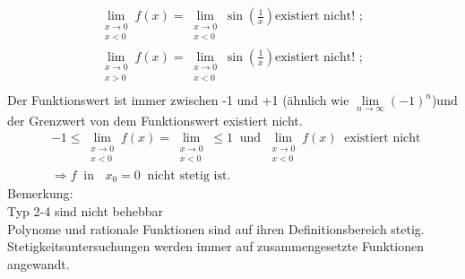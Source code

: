\begin{align*}
\lim\limits_ {\substack{x \to 0\\x<0}}f(x)=\lim\limits_ {\substack{x \to 0\\x<0}} \sin(\frac{1}{x})\text{existiert nicht! };\;\\
\lim\limits_ {\substack{x \to 0\\x>0}}f(x)=\lim\limits_ {\substack{x \to 0\\x<0}} \sin(\frac{1}{x})\text{existiert nicht! };\;\\
\end{align*}
Der Funktionswert ist immer zwischen -1 und +1 (ähnlich wie $ \lim\limits_ {n\to\infty}(-1)^n $)und der Grenzwert von dem Funktionswert existiert nicht.\\
\begin{align*}
&-1\leq\lim\limits_ {\substack{x \to 0\\x<0}}f(x)=\lim\limits_ {\substack{x \to 0\\x<0}}\leq 1 \;\;\text{und }\lim\limits_ {\substack{x \to 0\\x<0}}f(x)\;\;\text{existiert nicht }\\
&\Rightarrow f \;\;\text{in }\;\;x_0=0\;\;\text{nicht stetig ist. }
\end{align*}
Bemerkung:\\

\textbullet\;\;Typ 2-4 sind nicht behebbar\\

\textbullet\;\;Polynome und rationale Funktionen sind auf ihren Definitionsbereich stetig.\\

\textbullet\;\;Stetigkeitsuntersuchungen werden immer auf zusammengesetzte Funktionen angewandt.\\

